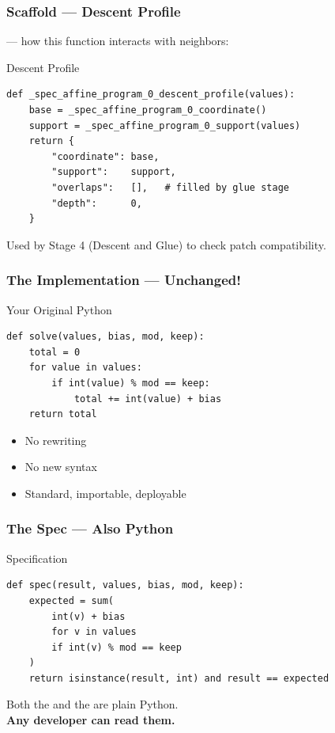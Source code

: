 \begin{frame}[fragile]
\frametitle{Scaffold --- Descent Profile}
 --- how this function interacts with neighbors:
\vspace{4pt}
\begin{block}{Descent Profile}
\begin{lstlisting}
def _spec_affine_program_0_descent_profile(values):
    base = _spec_affine_program_0_coordinate()
    support = _spec_affine_program_0_support(values)
    return {
        "coordinate": base,
        "support":    support,
        "overlaps":   [],   # filled by glue stage
        "depth":      0,
    }
\end{lstlisting}
\end{block}
\vspace{4pt}
Used by Stage 4 (Descent and Glue) to check patch compatibility.
\end{frame}

\begin{frame}[fragile]
\frametitle{The Implementation --- Unchanged!}
\begin{exampleblock}{Your Original Python}
\begin{lstlisting}
def solve(values, bias, mod, keep):
    total = 0
    for value in values:
        if int(value) % mod == keep:
            total += int(value) + bias
    return total
\end{lstlisting}
\end{exampleblock}
\vspace{6pt}
\begin{itemize}
  \item[\textcolor{jugeoGreen}{$\checkmark$}] No rewriting
  \item[\textcolor{jugeoGreen}{$\checkmark$}] No new syntax
  \item[\textcolor{jugeoGreen}{$\checkmark$}] Standard, importable, deployable
\end{itemize}
\end{frame}

\begin{frame}[fragile]
\frametitle{The Spec --- Also Python}
\begin{block}{Specification}
\begin{lstlisting}
def spec(result, values, bias, mod, keep):
    expected = sum(
        int(v) + bias
        for v in values
        if int(v) % mod == keep
    )
    return isinstance(result, int) and result == expected
\end{lstlisting}
\end{block}
\vspace{8pt}
\begin{center}
Both the  and the  are plain Python.\\[4pt]
\textbf{Any developer can read them.}
\end{center}
\end{frame}

